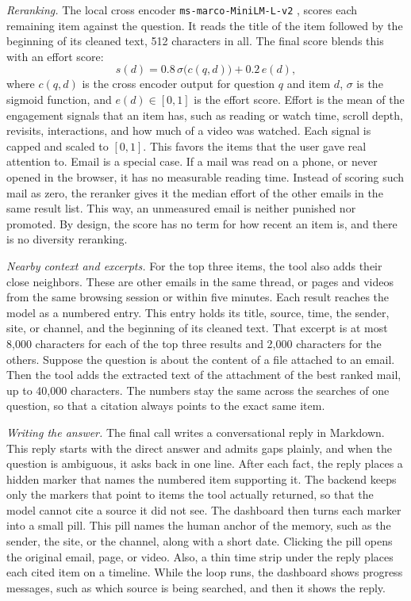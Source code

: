 \documentclass[conference]{IEEEtran}
\newcommand{\rerankmodel}{\texttt{ms\allowbreak-marco\allowbreak-MiniLM\allowbreak-L\allowbreak-6\allowbreak-v2}}
\begin{document}
\textit{Reranking.} The local cross encoder \rerankmodel{} \cite{b10}, \cite{b11} scores each remaining item against the question. It reads the title of the item followed by the beginning of its cleaned text, 512 characters in all. The final score blends this with an effort score:
\begin{equation}
s(d) = 0.8\,\sigma\big(c(q,d)\big) + 0.2\,e(d), \label{eq:final}
\end{equation}
where $c(q,d)$ is the cross encoder output for question $q$ and item $d$, $\sigma$ is the sigmoid function, and $e(d) \in [0,1]$ is the effort score. Effort is the mean of the engagement signals that an item has, such as reading or watch time, scroll depth, revisits, interactions, and how much of a video was watched. Each signal is capped and scaled to $[0,1]$. This favors the items that the user gave real attention to. Email is a special case. If a mail was read on a phone, or never opened in the browser, it has no measurable reading time. Instead of scoring such mail as zero, the reranker gives it the median effort of the other emails in the same result list. This way, an unmeasured email is neither punished nor promoted. By design, the score has no term for how recent an item is, and there is no diversity reranking.

\textit{Nearby context and excerpts.} For the top three items, the tool also adds their close neighbors. These are other emails in the same thread, or pages and videos from the same browsing session or within five minutes. Each result reaches the model as a numbered entry. This entry holds its title, source, time, the sender, site, or channel, and the beginning of its cleaned text. That excerpt is at most 8,000 characters for each of the top three results and 2,000 characters for the others. Suppose the question is about the content of a file attached to an email. Then the tool adds the extracted text of the attachment of the best ranked mail, up to 40,000 characters. The numbers stay the same across the searches of one question, so that a citation always points to the exact same item.

\textit{Writing the answer.} The final call writes a conversational reply in Markdown. This reply starts with the direct answer and admits gaps plainly, and when the question is ambiguous, it asks back in one line. After each fact, the reply places a hidden marker that names the numbered item supporting it. The backend keeps only the markers that point to items the tool actually returned, so that the model cannot cite a source it did not see. The dashboard then turns each marker into a small pill. This pill names the human anchor of the memory, such as the sender, the site, or the channel, along with a short date. Clicking the pill opens the original email, page, or video. Also, a thin time strip under the reply places each cited item on a timeline. While the loop runs, the dashboard shows progress messages, such as which source is being searched, and then it shows the reply.
\end{document}
